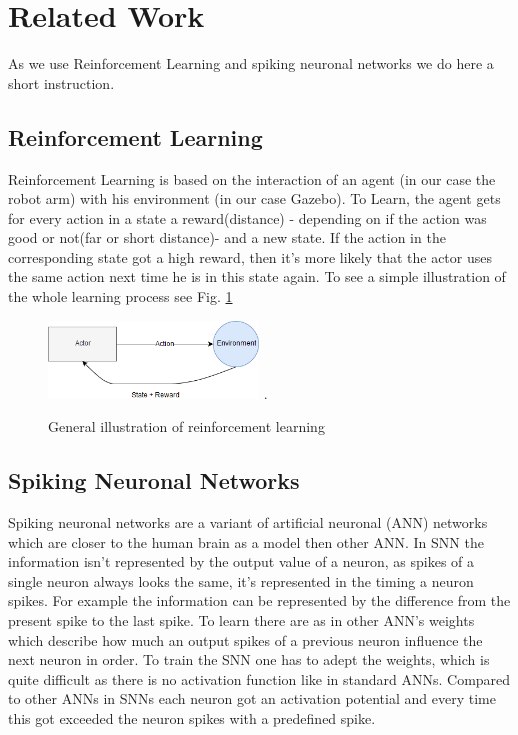 \section{Related Work}%
As we use Reinforcement Learning and spiking neuronal networks we do here a short instruction.
\subsection{Reinforcement Learning}%
Reinforcement Learning is based on the interaction of an agent (in our case the robot arm) with his environment (in our case Gazebo). To Learn, the agent gets for every action in a state a reward(distance) - depending on if the action was good or not(far or short distance)- and a new state. If the action in the corresponding state got a high reward, then it's more likely that the actor uses the same action next time he is in this state again. To see a simple illustration of the whole learning process see Fig. \ref{re_base}
\begin{figure}[H]
	\centering
	\includegraphics[width=2.2in]{img/re_base.png}
	\DeclareGraphicsExtensions.
	\caption{General illustration of reinforcement learning}
	\label{re_base}
\end{figure}

\subsection{Spiking Neuronal Networks}%
Spiking neuronal networks are a variant of artificial neuronal (ANN) networks which are closer to the human brain as a model then other ANN. In SNN the information isn't represented by the output value of a neuron, as spikes of a single neuron always looks the same, it's represented in the timing a neuron spikes. For example the information can be represented by the difference from the present spike to the last spike. To learn there are as in other ANN's weights which describe how much an output spikes of a previous neuron influence the next neuron in order. To train the SNN one has to adept the weights, which is quite difficult as there is no activation function like in standard ANNs. Compared to other ANNs in SNNs each neuron got an activation potential and every time this got exceeded the neuron spikes with a predefined spike.

